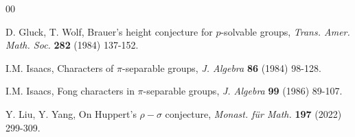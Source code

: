 \documentclass[11pt]{amsart}
\begin{document}
\begin{thebibliography}{00}




  D. Gluck, T. Wolf, Brauer's height conjecture for $p$-solvable groups, {\it Trans. Amer. Math. Soc.} {\textbf{282}} (1984) 137-152.




 I.M. Isaacs, Characters of $\pi$-separable groups, \textsl{J. Algebra} \textbf{86} (1984) 98-128.

  I.M. Isaacs, Fong characters in $\pi$-separable groups, {\it J. Algebra} {\textbf{99}} (1986) 89-107.




  Y. Liu, Y. Yang, On Huppert's $\rho-\sigma$ conjecture, {\it Monast. f\"ur Math.} {\textbf{197}} (2022) 299-309.



\end{thebibliography}
\end{document}
